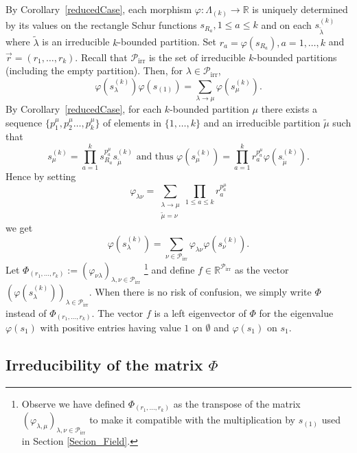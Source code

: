 \documentclass[ALCO,ThmDefs,Unicode,epreuves]{cedram}
\DeclareMathOperator{\irr}{irr}
\begin{document}
\label{subsec_MatrixFI}By Corollary~\ref{reducedCase}, each morphism
$\varphi:\Lambda_{(k)}\rightarrow\mathbb{R}$ is uniquely determined by its
values on the rectangle Schur functions $s_{R_{a}},1\leq a\leq k$ and on each
$s_{\tilde{\lambda}}^{(k)}$ where $\tilde{\lambda}$ is an irreducible
$k$-bounded partition. Set $r_{a}=\varphi(s_{R_{a}}),a=1,\ldots,k$ and
$\vec{r}=(r_{1},\ldots,r_{k})$. Recall that $\mathcal{P}_{\irr }$ is
the set of irreducible $k$-bounded partitions (including the empty partition).
Then, for $\lambda\in\mathcal{P}_{\irr }$,
\begin{equation}
\varphi(s_{\lambda}^{(k)})\varphi(s_{(1)})=\sum_{\lambda\rightarrow\mu}%
\varphi(s_{\mu}^{(k)}). \label{PieriPhi}%
\end{equation}
By Corollary~\ref{reducedCase}, for each $k$-bounded partition $\mu$ there
exists a sequence $\{p_{1}^{\mu},p_{2}^{\mu}\ldots,p_{k}^{\mu}\}$ of elements
in $\{1,\dots,k\}$ and an irreducible partition $\widetilde{\mu}$ such that
\begin{equation}
s_{\mu}^{(k)}=\prod_{a=1}^{k}s_{R_{a}}^{p_{a}^{\mu}}s_{\widetilde{\mu}}%
^{(k)}\text{ and thus }\varphi(s_{\mu}^{(k)})=\prod_{a=1}^{k}r_{a}^{p_{a}%
^{\mu}}\varphi(s_{\widetilde{\mu}}^{(k)}). \label{decompos}%
\end{equation}
Hence by setting
\[
\varphi_{\lambda\nu}=\sum_{\substack{\lambda\rightarrow\mu\\\widetilde{\mu
}=\nu}}\prod_{1\leq a\leq k}r_{a}^{p_{a}^{\mu}}%
\]
we get
\[
\varphi(s_{\lambda}^{(k)})=\sum_{\nu\in\mathcal{P}_{\irr }}%
\varphi_{\lambda\nu}\varphi(s_{\nu}^{(k)}).
\]
Let $\Phi_{(r_{1},\ldots,r_{k})}:=(\varphi_{\nu\lambda})_{\lambda,\nu
\in\mathcal{P}_{\irr }}$ \footnote{Observe we have defined
$\Phi_{(r_{1},\ldots,r_{k})}$ as the transpose of the matrix $(\varphi
_{\lambda,\mu})_{\lambda,\nu\in\mathcal{P}_{\irr }}$ to make it
compatible with the multiplication by $s_{(1)}$ used in Section
\ref{Secion_Field}.} and define $f\in\mathbb{R}^{\mathcal{P}_{\irr }}$
as the vector $(\varphi(s_{\lambda}^{(k)}))_{\lambda\in\mathcal{P}%
_{\irr }}$. When there is no risk of confusion, we simply write $\Phi$
instead of $\Phi_{(r_{1},\ldots,r_{k})}$. The vector $f$ is a left eigenvector
of $\Phi$ for the eigenvalue $\varphi(s_{1})$ with positive entries having
value $1$ on $\emptyset$ and $\varphi(s_{1})$ on $s_{1}$.

\subsection{Irreducibility of the matrix \texorpdfstring{$\Phi$}{Phi}}
\end{document}
